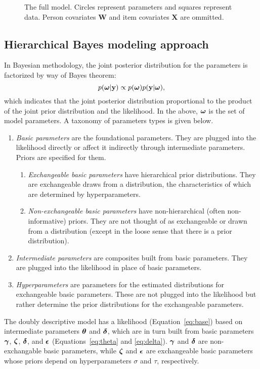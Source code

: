 \documentclass[12pt, letterpaper]{article}
\begin{document}
\begin{figure}[btp]
	\centering
	
	\caption{The full model. Circles represent parameters and squares represent data. Person covariates $\mathbf{W}$ and item covariates $\mathbf{X}$ are ommitted.}
	\label{fig:eirm-model}
\end{figure}


\subsection{Hierarchical Bayes modeling approach}

In Bayesian methodology, the joint posterior distribution for the parameters is factorized by way of Bayes theorem:
\begin{equation} \label{eq:bayes}
	p(\boldsymbol{\omega} | \mathbf{y}) \propto
	p(\boldsymbol{\omega})
	p(\mathbf{y} | \boldsymbol{\omega})
,\end{equation}
which indicates that the joint posterior distribution proportional to the product of the joint prior distribution and the likelihood. In the above, $\boldsymbol{\omega}$ is the set of model parameters. A taxonomy of parameters types is given below.
\begin{enumerate}
	\item \emph{Basic parameters}
	are the foundational parameters. They are plugged into the likelihood directly or affect it indirectly through intermediate parameters. Priors are specified for them.
	\begin{enumerate}
		\item \emph{Exchangeable basic parameters} 
		have hierarchical prior distributions. They are exchangeable draws from a distribution, the characteristics of which are determined by hyperparameters.
		\item \emph{Non-exchangeable basic parameters}
		have non-hierarchical (often non-informative) priors. They are not thought of as exchangeable or drawn from a distribution (except in the loose sense that there is a prior distribution).
	\end{enumerate}
	\item \emph{Intermediate parameters}
	are composites built from basic parameters. They are plugged into the likelihood in place of basic parameters.
	\item \emph{Hyperparameters}
	are parameters for the estimated distributions for exchangeable basic parameters. These are not plugged into the likelihood but rather determine the prior distributions for the exchangeable parameters.
\end{enumerate}
The doubly descriptive model has a likelihood (Equation~\ref{eq:base}) based on intermediate parameters $\boldsymbol{\theta}$ and $\boldsymbol{\delta}$, which are in turn built from basic parameters $\boldsymbol{\gamma}$, $\boldsymbol{\zeta}$, $\boldsymbol{\delta}$, and $\boldsymbol{\epsilon}$ (Equations~\ref{eq:theta} and \ref{eq:delta}). $\boldsymbol{\gamma}$ and $\boldsymbol{\delta}$ are non-exchangable basic parameters, while $\boldsymbol{\zeta}$ and $\boldsymbol{\epsilon}$ are exchangeable basic parameters whose priors depend on hyperparameters $\sigma$ and $\tau$, respectively.
\end{document}
